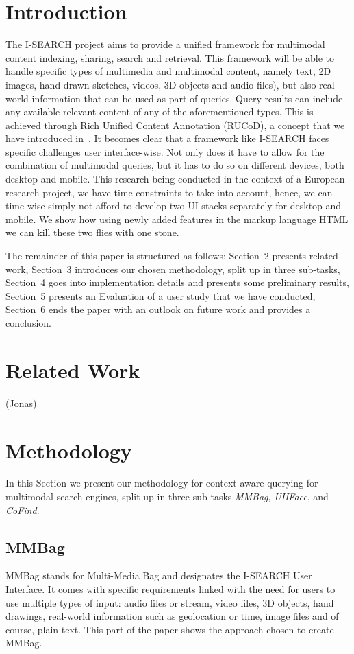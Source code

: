 \documentclass[runningheads,a4paper]{llncs} \usepackage[utf8]{inputenc}
\begin{document}
\section{Introduction}
The I-SEARCH project aims to provide a unified framework for multimodal content indexing, sharing, search and retrieval. This framework will be able to handle specific types of multimedia and multimodal content, namely text, 2D images, hand-drawn sketches, videos, 3D objects and audio files), but also real world information that can be used as part of queries. Query results can include any available relevant content of any of the aforementioned types. This is achieved through Rich Unified Content Annotation (RUCoD), a concept that we have introduced in~\cite{ijmis}. It becomes clear that a framework like I-SEARCH faces specific challenges user interface-wise. Not only does it have to allow for the combination of multimodal queries, but it has to do so on different devices, both desktop and mobile. This research being conducted in the context of a European research project, we have time constraints to take into account, hence, we can time-wise simply not afford to develop two UI stacks separately for desktop and mobile. We show how using newly added features in the markup language HTML  we can kill these two flies with one stone.

The remainder of this paper is structured as follows: Section~2 presents related work, Section~3 introduces our chosen methodology, split up in three sub-tasks, Section~4 goes into implementation details and presents some preliminary results, Section~5 presents an Evaluation of a user study that we have conducted, Section~6 ends the paper with an outlook on future work and provides a conclusion.

\section{Related Work}
(Jonas) \cite{nigay}

\section{Methodology}
In this Section we present our methodology for context-aware querying for multimodal search engines, split up in three sub-tasks \emph{MMBag}, \emph{UIIFace}, and \emph{CoFind}.

\subsection{MMBag}
MMBag stands for Multi-Media Bag and designates the \mbox{I-SEARCH} User
Interface. It comes with specific requirements linked with the need for users to use multiple types of input: audio files or stream, video files, 3D objects, hand drawings, real-world information such as geolocation or time, image files and of course, plain text. This part of the paper shows the approach chosen to create MMBag.
\end{document}
